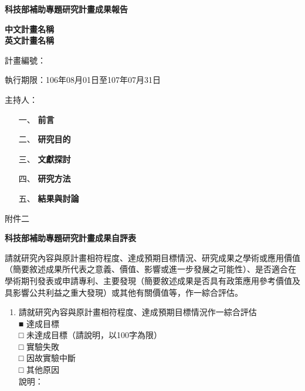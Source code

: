 \documentclass[12pt]{article}
\begin{document}
\begin{CJK}{UTF8}{}
\newpage
\begin{center}
{\bf \Large 科技部補助專題研究計畫成果報告}
\vspace*{1cm}


{\bf \Large  中文計畫名稱  \\ 英文計畫名稱}

\vspace*{1cm}

{\large 計畫編號：  }

\vspace*{0.3cm}
{ 執行期限：106年08月01日至107年07月31日}

\vspace*{0.3cm}
{\large 主持人： }

\end{center}
\begin{enumerate}
 \item [一、] {\bf 前言}

  
 \item [二、]{\bf 研究目的}

 \item [三、]{\bf 文獻探討}

 \item [四、]{\bf 研究方法}

\item[五、] {\bf 結果與討論}
\end{enumerate}

\newpage
\vspace*{-1cm}
\noindent 附件二
\vspace*{1cm}
\begin{center}
{\bf \Large 科技部補助專題研究計畫成果自評表}
\end{center}

\vspace*{1cm}

請就研究內容與原計畫相符程度、達成預期目標情況、研究成果之學術或應用價值（簡要敘述成果所代表之意義、價值、影響或進一步發展之可能性）、是否適合在學術期刊發表或申請專利、主要發現（簡要敘述成果是否具有政策應用參考價值及具影響公共利益之重大發現）或其他有關價值等，作一綜合評估。

\begin{enumerate}
\item 請就研究內容與原計畫相符程度、達成預期目標情況作一綜合評估 \\
■ 達成目標 \\
□ 未達成目標（請說明，以100字為限） \\
\hspace*{2cm } □ 實驗失敗 \\
\hspace*{2cm } □ 因故實驗中斷 \\
\hspace*{2cm } □ 其他原因 \\
說明：


\end{enumerate}
\end{CJK}
\end{document}
